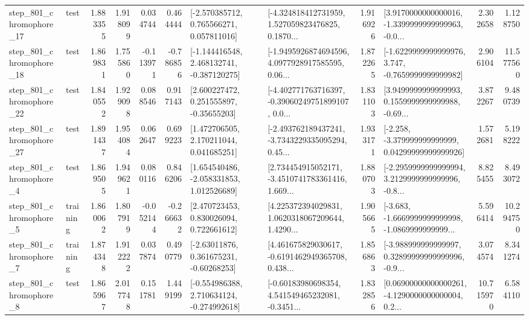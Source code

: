 \begin{tabular}{llrrrrllrlrr}
  step\_801\_chromophore\_17 &      test &      1.883355 &    1.918099 &      0.034744 &  0.464444 &    [-2.570385712, 0.765566271, 0.057811016] &  [-4.324818412731959, 1.527059823476825, 0.1870... &       1.916926 &  [3.9170000000000016, -1.3399999999999963, -0.0... &            2.302658 &          1.128750 \\
  step\_801\_chromophore\_18 &      test &      1.869831 &    1.755860 &     -0.113971 & -0.786856 &   [-1.144416548, 2.468132741, -0.387120275] &  [-1.9495926874694596, 4.0977928917585595, 0.06... &       1.872265 &  [-1.6229999999999976, 3.747, -0.7659999999999982] &            2.906104 &         11.577560 \\
  step\_801\_chromophore\_22 &      test &      1.840552 &    1.929098 &      0.088546 &  0.917143 &     [2.600227472, 0.251555897, -0.35655203] &  [-4.402771763716397, -0.39060249751899107, 0.0... &       1.831103 &  [3.9499999999999993, 0.1559999999999988, -0.69... &            3.872267 &          9.480739 \\
  step\_801\_chromophore\_27 &      test &      1.891437 &    1.954084 &      0.062647 &  0.699223 &     [1.472706505, 2.170211044, 0.041685251] &  [-2.493762189437241, -3.7343229335095294, 0.45... &       1.933171 &  [-2.258, -3.379999999999999, 0.04299999999999926] &            1.572681 &          5.198222 \\
   step\_801\_chromophore\_4 &      test &      1.869505 &    1.949621 &      0.080116 &  0.846206 &    [1.654540486, -2.058331853, 1.012526689] &  [2.734454915052171, -3.4510741783361416, 1.669... &       1.880703 &  [-2.2959999999999994, 3.2129999999999996, -0.8... &            8.825455 &          8.493072 \\
   step\_801\_chromophore\_5 &  training &      1.860062 &    1.807919 &     -0.052144 & -0.266632 &     [2.470723453, 0.830026094, 0.722661612] &  [4.225372394029831, 1.0620318067209644, 1.4290... &       1.905665 &  [-3.683, -1.6669999999999998, -1.0869999999999... &            5.596414 &         10.294750 \\
   step\_801\_chromophore\_7 &  training &      1.874348 &    1.912222 &      0.037874 &  0.490779 &     [-2.63011876, 0.361675231, -0.60268253] &  [4.461675829030617, -0.6191462949365708, 0.438... &       1.856863 &  [-3.988999999999997, 0.32899999999999996, -0.9... &            3.074574 &          8.341274 \\
   step\_801\_chromophore\_8 &      test &      1.865967 &    2.017748 &      0.151781 &  1.449199 &   [-0.554986388, 2.710634124, -0.274992618] &  [-0.60183980698354, 4.541549465232081, -0.3451... &       1.832856 &  [0.06900000000000261, -4.1290000000000004, 0.2... &           10.715970 &          6.584110 \\

\end{tabular}
